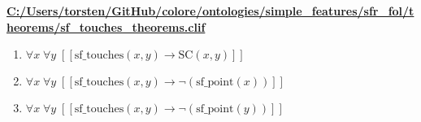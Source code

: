 \documentclass{article}
\begin{document}
\textbf{\url{C:/Users/torsten/GitHub/colore/ontologies/simple\_features/sfr\_fol/theorems/sf\_touches\_theorems.clif}}

\begin{enumerate}
\item $\forall x\; \forall y\;  \left[ \left[ \textrm{sf\_touches}(x,y) \rightarrow \textrm{SC}(x,y) \right] \right]$
\item $\forall x\; \forall y\;  \left[ \left[ \textrm{sf\_touches}(x,y) \rightarrow \neg \left(\textrm{sf\_point}(x)\right) \right] \right]$
\item $\forall x\; \forall y\;  \left[ \left[ \textrm{sf\_touches}(x,y) \rightarrow \neg \left(\textrm{sf\_point}(y)\right) \right] \right]$
\end{enumerate}
\end{document}
